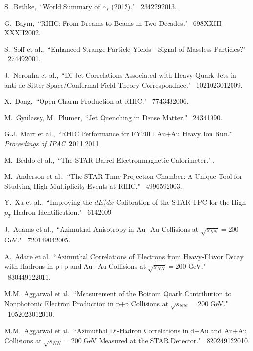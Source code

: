 \begin{thebibliography}{1000}

S.~Bethke,~``World Summary of $\alpha_{s}$ (2012)." \Journal{\NPB} {~234}{229}{2013}.

G.~Baym,~``RHIC: From Dreams to Beams in Two Decades." \Journal{\NPA} {~698}{XXIII-XXXII}{2002}.

S.~Soff et al.,~``Enhanced Strange Particle Yields - Signal of Massless Particles?" \Journal{\JPG} {~27}{449}{2001}.

J.~Noronha et al.,~``Di-Jet Correlations Associated with Heavy Quark Jets in anti-de Sitter Space/Conformal Field Theory Correspondnce." \Journal{\PRL} {~102}{102301}{2009}.

X.~Dong,~``Open Charm Production at RHIC." \Journal{\NPA} {~774}{343}{2006}.

M.~Gyulassy, M.~Plumer,~``Jet Quenching in Dense Matter." \Journal{\PLB} {~243}{4}{1990}.

G.J.~Marr et al.,~``RHIC Performance for FY2011 Au+Au Heavy Ion Run." \textit {Proceedings of IPAC}~{\textbf 2011} {2011}

M.~Beddo et al.,~``The STAR Barrel Electronmagnetic Calorimeter." .

M.~Anderson et al.,~``The STAR Time Projection Chamber: A Unique Tool for Studying High Multiplicity Events at RHIC." \Journal{\NIM } {~499}{659}{2003}.

Y.~Xu et al.,~``Improving the $dE/dx$ Calibration of the STAR TPC for the High $p_T$ Hadron Identification." \Journal{\NIM} {~614}{}{2009}

J.~Adams et al.,~``Azimuthal Anisotropy in Au+Au Collisions at $\sqrt{s_{NN}} = 200$ GeV." \Journal{\PRC} {~72}{014904}{2005}.

A.~Adare et al.~``Azimuthal Correlations of Electrons from Heavy-Flavor Decay with Hadrons in p+p and Au+Au Collisions at $\sqrt{s_{NN}} = 200$ GeV." \Journal{\PRC} {~83}{044912}{2011}.

M.M.~Aggarwal et al.~``Measurement of the Bottom Quark Contribution to Nonphotonic Electron Production in p+p Collisions at $\sqrt{s_{NN}} = 200$ GeV." \Journal{\PRL} {~105}{202301}{2010}.

M.M.~Aggarwal et al.~``Azimuthal Di-Hadron Correlations in d+Au and Au+Au Collisions at $\sqrt{s_{NN}} = 200$ GeV Measured at the STAR Detector." \Journal{\PRC} {~82}{024912}{2010}.


\end{thebibliography}
